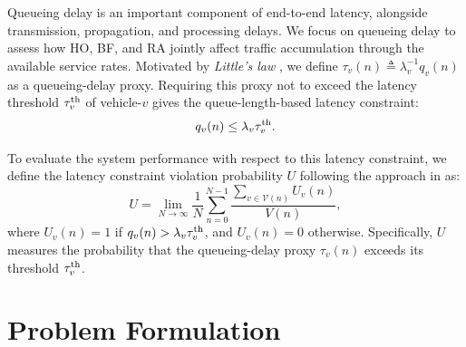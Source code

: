 \documentclass[10pt,journal,letterpaper]{IEEEtran}
\newcommand{\rev}[1]{\textcolor{revisioncolor}{{}#1}}
\newcommand{\omitted}[1]{}
\theoremstyle{remark}
\begin{document}
\omitted{}\rev{\rev{Queueing delay is an important component of end-to-end latency, alongside transmission, propagation, and processing delays. We focus on queueing delay to assess how HO, BF, and RA jointly affect traffic accumulation through the available service rates.} Motivated by} \textit{Little's law} \cite{little1961proof}, \omitted{}\rev{we define $\tau_v(n)\triangleq\lambda_v^{-1}q_v(n)$ as a queueing-delay proxy}. \omitted{}\rev{Requiring this proxy not to exceed the latency threshold $\tau_v^{\rm th}$ of  vehicle-$v$  gives the queue-length-based latency constraint}:
\begin{equation}
    q_v(n) \leq \lambda_v \text{\omitted{}}\rev{\tau_v^{\rm th}}.
    \label{eq:queue length cons}
\end{equation}

To evaluate the system performance with respect to this latency constraint, we define the latency constraint violation probability $U$ following the approach in \cite{kien17} as:
\begin{equation}
    U = \lim_{N\rightarrow\infty}\frac{1}{N}\sum_{n=0}^{N-1}  \frac{\sum_{v\in\mathcal{V}(n)}U_v(n)}{V(n)},
    \label{eq:violation probability}
\end{equation}
where $U_v(n) = 1$ if $q_v(n) > \lambda_v \text{\omitted{}}\rev{\tau_v^{\rm th}}$, and $U_v(n) = 0$ otherwise. \omitted{}\rev{Specifically, $U$ measures the probability that the queueing-delay proxy $\tau_v(n)$ exceeds its threshold $\tau_v^{\rm th}$.}


\section{Problem Formulation}{\label{sec:Problem Formulation}}
\end{document}
